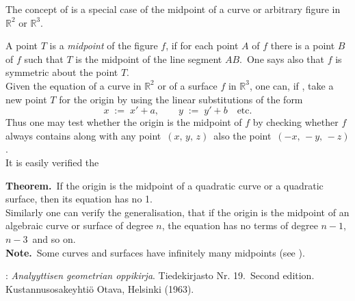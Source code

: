 \documentclass[12pt]{article}
\theoremstyle{definition}
\begin{document}
The concept of  is a special case of the midpoint of a curve or arbitrary figure in $\mathbb{R}^2$ or $\mathbb{R}^3$.

A point $T$ is a {\em midpoint} of the figure $f$, if for each point $A$ of $f$ there is a point $B$ of $f$ such that $T$ is the midpoint of the line segment $AB$.\, One says also that $f$ is symmetric about the point $T$.\\


Given the equation of a curve in $\mathbb{R}^2$ or of a surface $f$ in $\mathbb{R}^3$, one can, if , take a new point $T$ for the origin by using the linear substitutions of the form
$$x \;:=\; x'\!+\!a, \qquad y \;:=\; y'\!+\!b \quad \mbox{etc.}$$
Thus one may test whether the origin is the midpoint of $f$ by checking whether $f$ always contains along with any point\, $(x,\,y,\,z)$\, also the point\, $(-x,\,-y,\,-z)$.\\

It is easily verified the

\textbf{Theorem.}\, If the origin is the midpoint of a quadratic curve or a quadratic surface, then its equation has no  1.\\

Similarly one can verify the generalisation, that if the origin is the midpoint of an algebraic curve or surface of degree $n$, the equation has no terms of degree $n\!-\!1$,\, $n\!-\!3$\, and so on.\\

\textbf{Note.}\, Some curves and surfaces have infinitely many midpoints (see ).

\begin{thebibliography}{8}
: {\em Analyyttisen geometrian oppikirja}. Tiedekirjasto Nr. 19.\, Second edition.\, Kustannusosakeyhti\"o Otava, Helsinki (1963).
\end{thebibliography}





\end{document}

